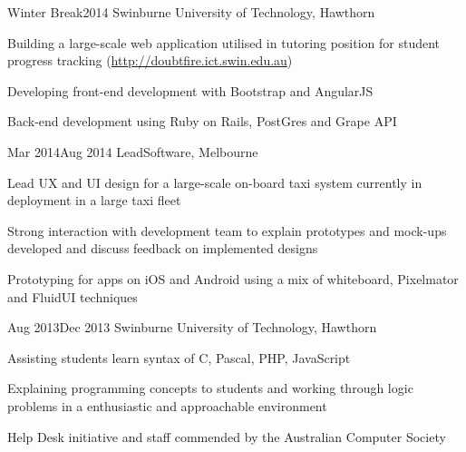 {{        }
        {Winter Break}{2014}
        {Swinburne University of Technology, Hawthorn}
        {
            \item Building a large-scale web application utilised in tutoring position for student progress tracking (\href{http://doubtfire.ict.swin.edu.au}{http://doubtfire.ict.swin.edu.au})
            \item Developing front-end development with Bootstrap and AngularJS
            \item Back-end development using Ruby on Rails, PostGres and Grape API
        }
        {Mar 2014}{Aug 2014}
        {LeadSoftware, Melbourne}
        {
            \item Lead UX and UI design for a large-scale on-board taxi system currently in deployment in a large taxi fleet
            \item Strong interaction with development team to explain prototypes and mock-ups developed and discuss feedback on implemented designs
            \item Prototyping for apps on iOS and Android using a mix of whiteboard, Pixelmator and FluidUI techniques
        }
        {Aug 2013}{Dec 2013}
        {Swinburne University of Technology, Hawthorn}
        {
            \item Assisting students learn syntax of C, Pascal, PHP, JavaScript
            \item Explaining programming concepts to students and working through logic problems in a enthusiastic and approachable environment
            \item Help Desk initiative and staff commended by the Australian Computer Society
        }
}